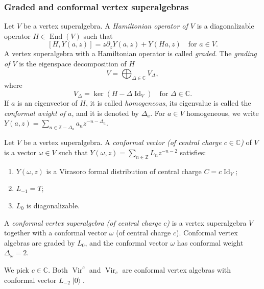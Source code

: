 \documentclass{beamer}
\DeclareMathOperator{\Vir}{Vir}
\DeclareMathOperator{\Id}{Id}
\DeclareMathOperator{\End}{End}
\DeclareMathOperator{\vac}{|0\rangle}
\begin{document}
\begin{frame}
  \frametitle{Graded and conformal vertex superalgebras}

  Let $V$ be a vertex superalgebra.
  A \emph{Hamiltonian operator of $V$} is a diagonalizable operator $H \in \End(V)$ such that
  \begin{equation}
    \label{eq:1}
    [H, Y(a, z)] = z\partial_zY(a, z) + Y(Ha, z) \quad \text{for $a \in V$}.
  \end{equation}
  A vertex superalgebra with a Hamiltonian operator is called \emph{graded}.
  The \emph{grading of $V$} is the eigenspace decomposition of $H$
  \begin{equation*}
    V = \bigoplus_{\Delta \in \mathbb{C}}V_{\Delta},
  \end{equation*}
  where
  \begin{equation*}
    V_{\Delta} = \ker(H - \Delta\Id_V) \quad \text{for $\Delta \in \mathbb{C}$}.
  \end{equation*}
  If $a$ is an eigenvector of $H$, it is called \emph{homogeneous}, its eigenvalue is called the \emph{conformal weight of $a$}, and it is denoted by $\Delta_a$.
  For $a \in V$ homogeneous, we write $Y(a, z) = \sum_{n \in \mathbb{Z} - \Delta_a}a_nz^{-n - \Delta_a}$.

\end{frame}

\begin{frame}

  Let $V$ be a vertex superalgebra.
  A \emph{conformal vector (of central charge $c \in \mathbb{C}$)} of $V$ is a vector $\omega \in V$ such that $Y(\omega, z) = \sum_{n \in \mathbb{Z}}L_nz^{-n - 2}$ satisfies:
  \begin{enumerate}
  \item $Y(\omega, z)$ is a Virasoro formal distribution of central charge $C = c\Id_V$;
  \item $L_{-1} = T$;
  \item $L_0$ is diagonalizable.
  \end{enumerate}

  A \emph{conformal vertex superalgebra (of central charge $c$)} is a vertex superalgebra $V$ together with a conformal vector $\omega$ (of central charge $c$).
  Conformal vertex algebras are graded by $L_0$, and the conformal vector $\omega$ has conformal weight $\Delta_{\omega} = 2$.

  \begin{example}
    \label{exa:3}
    We pick $c \in \mathbb{C}$.
    Both $\Vir^c$ and $\Vir_c$ are conformal vertex algebras with conformal vector $L_{-2}\vac$.
  \end{example}

\end{frame}
\end{document}
